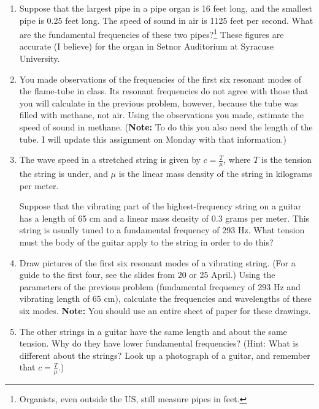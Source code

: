 \documentclass[12pt]{article}
\begin{document}
\Large
\centerline{}
\normalsize
\centerline{}


\begin{enumerate}

\item Suppose that the largest pipe in a pipe organ is 16 feet long, and the smallest pipe is 0.25 feet long. The speed of sound in air is 1125 feet per second. What 
are the fundamental frequencies of these two pipes?\footnote{Organists, even outside the US, still measure pipes in feet.} These figures are accurate (I believe) for the
organ in Setnor Auditorium at Syracuse University.

\item You made observations of the frequencies of the first six resonant modes of the flame-tube in class. Its resonant frequencies do not agree with those that you will
calculate in the previous problem, however, because the tube was filled with methane, not air. Using the observations you made, estimate the speed of sound in methane.
({\bf Note:} To do this you also need the length of the tube. I will update this assignment on Monday with that information.)

\item The wave speed in a stretched string is given by $c=\frac{T}{\mu}$, where $T$ is the tension the string is under, and $\mu$ is the linear mass 
density of the string in kilograms per meter. 

Suppose that the vibrating part of the highest-frequency string on a guitar has a length of 65 cm and a linear mass density of 0.3 grams per meter. This string
is usually tuned to a fundamental frequency of 293 Hz. What tension must the body of the guitar apply to the string in order to do this?

\item Draw pictures of the first six resonant modes of a vibrating string. (For a guide to the first four, see the slides from 20 or 25 April.) Using the parameters
of the previous problem (fundamental frequency of 293 Hz and vibrating length of 65 cm), calculate the frequencies and wavelengths of these six modes. {\bf Note: 
} You should use an entire sheet of paper for these drawings.

\item The other strings in a guitar have the same length and about the same tension. Why do they have lower fundamental frequencies? (Hint: What is different 
about the strings? Look up a photograph of a guitar, and remember that $c=\frac{T}{\mu}$.) 


\end{enumerate}
\end{document}
